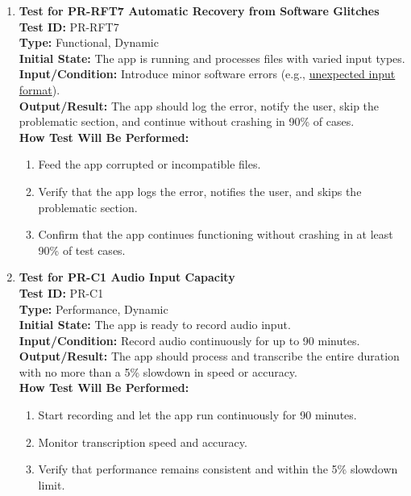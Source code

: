 \documentclass[12pt, titlepage]{article}
\begin{document}
\begin{enumerate}
    \item \textbf{Test for PR-RFT7 Automatic Recovery from Software Glitches} \\
      \newline
      \textbf{Test ID:} PR-RFT7 \\
      \textbf{Type:} Functional, Dynamic \\
      \textbf{Initial State:} The app is running and processes files with varied input types. \\
      \textbf{Input/Condition:} Introduce minor software errors (e.g., 
      \href{https://github.com/emilyperica/ScoreGen/tree/main/test/TestingDatasets/sample-formats}{unexpected input format}). \\
      \textbf{Output/Result:} The app should log the error, notify the user, skip the problematic section, and continue 
      without crashing in 90\% of cases. \\
      \textbf{How Test Will Be Performed:}
      \begin{enumerate}
          \item Feed the app corrupted or incompatible files.
          \item Verify that the app logs the error, notifies the user, and skips the problematic section.
          \item Confirm that the app continues functioning without crashing in at least 90\% of test cases.
      \end{enumerate}

    \item \textbf{Test for PR-C1 Audio Input Capacity} \\
      \newline
      \textbf{Test ID:} PR-C1 \\
      \textbf{Type:} Performance, Dynamic \\
      \textbf{Initial State:} The app is ready to record audio input. \\
      \textbf{Input/Condition:} Record audio continuously for up to 90 minutes. \\
      \textbf{Output/Result:} The app should process and transcribe the entire duration with no more than a 5\% slowdown 
      in speed or accuracy. \\
      \textbf{How Test Will Be Performed:}
      \begin{enumerate}
          \item Start recording and let the app run continuously for 90 minutes.
          \item Monitor transcription speed and accuracy.
          \item Verify that performance remains consistent and within the 5\% slowdown limit.
      \end{enumerate}


\end{enumerate}
\end{document}

